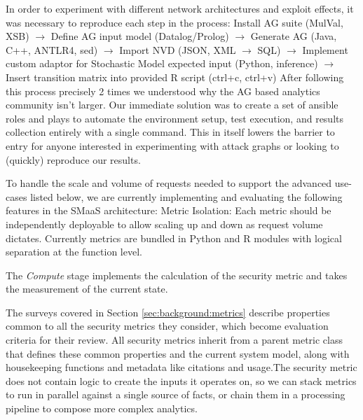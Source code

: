 In order to experiment with different network architectures and exploit effects, it was necessary to reproduce each step in the process: 
Install AG suite (MulVal, XSB) $\rightarrow$ Define AG input model (Datalog/Prolog) $\rightarrow$ Generate AG (Java, C++, ANTLR4, sed) $\rightarrow$ Import NVD (JSON, XML $\rightarrow$ SQL) $\rightarrow$ Implement custom adaptor for Stochastic Model expected input (Python, inference) $\rightarrow$ Insert transition matrix into provided R script (ctrl+c, ctrl+v) 
After following this process precisely 2 times we understood why the AG based analytics community isn’t larger. Our immediate solution was to create a set of ansible roles and plays to automate the environment setup, test execution, and results collection entirely with a single command. This in itself lowers the barrier to entry for anyone interested in experimenting with attack graphs or looking to (quickly) reproduce our results.



To handle the scale and volume of requests needed to support the advanced use-cases listed below, we are currently implementing and evaluating the following features in the SMaaS architecture:
Metric Isolation: Each metric should be independently deployable to allow scaling up and down as request volume dictates. Currently metrics are bundled in Python and R modules with logical separation at the function level.


The \textit{Compute} stage implements the calculation of the security metric and takes the measurement of the current state. 

The surveys covered in Section \ref{sec:background:metrics} describe properties common to all the security metrics they consider, which become evaluation criteria for their review. All security metrics inherit from a parent metric class that defines these common properties and the current system model, along with housekeeping functions and metadata like citations and usage.The security metric does not contain logic to create the inputs it operates on, so we can stack metrics to run in parallel against a single source of facts, or chain them in a processing pipeline to compose more complex analytics. 



